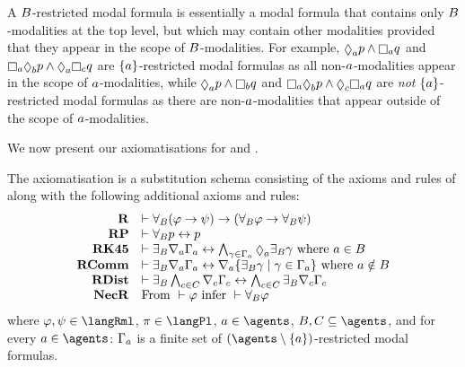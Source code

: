 A $B$-restricted modal formula is essentially a modal formula that contains only $B$-modalities at the top level, but which may contain other modalities provided that they appear in the scope of $B$-modalities.
For example, $\possibleA \atomP \land \necessaryA \atomQ$ and $\necessaryA \possibleB \atomP \land \possibleA \necessaryC \atomQ$ are $\{a\}$-restricted modal formulas as all non-$a$-modalities appear in the scope of $a$-modalities, while $\possibleA \atomP \land \necessaryB \atomQ$ and $\necessaryA \possibleB \atomP \land \possibleC \necessaryA \atomQ$ are {\em not} $\{a\}$-restricted modal formulas as there are non-$a$-modalities that appear outside of the scope of $a$-modalities.

We now present our axiomatisations for \logicRmlKFF{} and \logicRmlKD{}.

\begin{definition}
The axiomatisation \axiomRmlKFF{} is a substitution schema consisting of the axioms and rules of \axiomKFF{} along with the following additional axioms and rules:
$$
\begin{array}{rl}
    {\bf R} & \proves \allrefsBs (\phi \implies \psi) \implies (\allrefsBs \phi \implies \allrefsBs \psi)\\
    {\bf RP} & \proves \allrefsBs \atomP \iff \atomP\\
    {\bf RK45} & \proves \somerefsBs \coversA \Gamma_\agentA \iff \bigwedge_{\gamma \in \Gamma_\agentA} \possibleA \somerefsBs \gamma \text{ where } \agentA \in \agentsB\\
    {\bf RComm} & \proves \somerefsBs \coversA \Gamma_\agentA \iff \coversA \{\somerefsBs \gamma \mid \gamma \in \Gamma_\agentA\} \text{ where } \agentA \notin \agentsB\\
    {\bf RDist} & \proves \somerefsBs \bigwedge_{\agentC \in \agentsC} \coversC \Gamma_\agentC \iff \bigwedge_{\agentC \in \agentsC} \somerefsBs \coversC \Gamma_\agentC\\
    {\bf NecR} & \text{From } \proves \phi \text{ infer } \proves \allrefsBs \phi
\end{array}
$$
where $\phi, \psi \in \langRml$, $\pi \in \langPl$, $\agentA \in \agents$, $\agentsB, \agentsC \subseteq \agents$, and for every $\agentA \in \agents$: $\Gamma_a$ is a finite set of $(\agents \setminus \{\agentA\})$-restricted modal formulas.
\end{definition}

